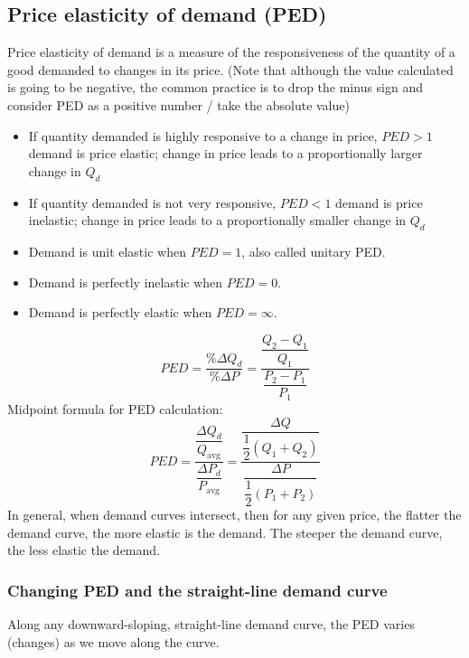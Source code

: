 \documentclass[a4paper,12pt]{article}
\begin{document}
\subsection{Price elasticity of demand (PED)}
Price elasticity of demand is a measure of the responsiveness of the quantity of a good demanded to changes in its price. (Note that although the value calculated is going to be negative, the common practice is to drop the minus sign and consider PED as a positive number / take the absolute value)
\begin{itemize}
  \item If quantity demanded is highly responsive to a change in price, $PED>1$ demand is price elastic; change in price leads to a proportionally larger change in $Q_d$
  \item If quantity demanded is not very responsive, $PED<1$ demand is price inelastic; change in price leads to a proportionally smaller change in $Q_d$
  \item Demand is unit elastic when $PED=1$, also called unitary PED.
  \item Demand is perfectly inelastic when $PED=0$.
  \item Demand is perfectly elastic when $PED=\infty$.
\end{itemize}
\[PED=\dfrac{\%\Delta Q_d}{\%\Delta P}=\dfrac{\dfrac{Q_2-Q_1}{Q_1}}{\dfrac{P_2-P_1}{P_1}}\]
Midpoint formula for PED calculation:
\[PED=\dfrac{\dfrac{\Delta Q_d}{Q_\text{avg}}}{\dfrac{\Delta P_d}{P_\text{avg}}}=\dfrac{\dfrac{\Delta Q}{\dfrac{1}{2}(Q_1+Q_2)}}{\dfrac{\Delta P}{\dfrac{1}{2}(P_1+P_2)}}\]
In general, when demand curves intersect, then for any given price, the flatter the demand curve, the more elastic is the demand. The steeper the demand curve, the less elastic the demand.
\subsubsection*{Changing PED and the straight-line demand curve}
Along any downward-sloping, straight-line demand curve, the PED varies (changes) as we move along the curve.
\end{document}
